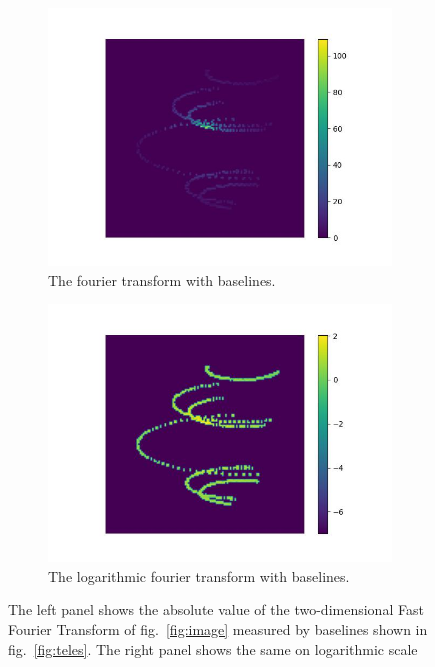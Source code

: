 \documentclass[fleqn,usenatbib,twocolumn]{mnras}
\begin{document}
\begin{figure}
	\centering
	\begin{subfigure}{0.5\linewidth}
		\includegraphics[width=\linewidth]{fig/ft/ft_base.jpg}
		\caption{The fourier transform with baselines.}
	\end{subfigure}\hfill
	\begin{subfigure}{0.5\linewidth}
		\includegraphics[width=\linewidth]{fig/ft/ft_log_base.jpg}
		\caption{The logarithmic fourier transform with baselines.}
	\end{subfigure}
	\caption{The left panel shows the absolute value of the two-dimensional Fast Fourier Transform of fig.~\ref{fig:image} measured by baselines shown in fig.~\ref{fig:teles}. The right panel shows the same on logarithmic scale}
	\label{fig:ft_base}
\end{figure}
\end{document}
